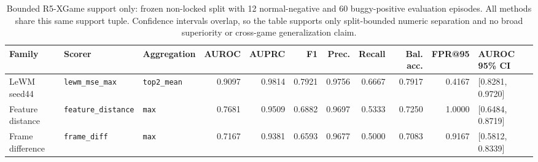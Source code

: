 \begin{table}[t]
\centering
\caption{Bounded R5-XGame support only: frozen non-locked split with 12 normal-negative and
60 buggy-positive evaluation episodes. All methods share this same support tuple. Confidence
intervals overlap, so the table supports only split-bounded numeric separation and no broad
superiority or cross-game generalization claim.}
\label{tab:r5-xgame-results}
\scriptsize
\begin{tabularx}{\textwidth}{@{}lXlrrrrrrrX@{}}
\toprule
Family & Scorer & Aggregation & AUROC & AUPRC & F1 & Prec. & Recall & Bal. acc. & FPR@95 & AUROC 95\% CI \\
\midrule
LeWM seed44 & \texttt{lewm\_mse\_max} & \texttt{top2\_mean} & 0.9097 & 0.9814 & 0.7921 & 0.9756 & 0.6667 & 0.7917 & 0.4167 & [0.8281, 0.9720] \\
Feature distance & \texttt{feature\_distance} & \texttt{max} & 0.7681 & 0.9509 & 0.6882 & 0.9697 & 0.5333 & 0.7250 & 1.0000 & [0.6484, 0.8719] \\
Frame difference & \texttt{frame\_diff} & \texttt{max} & 0.7167 & 0.9381 & 0.6593 & 0.9677 & 0.5000 & 0.7083 & 0.9167 & [0.5812, 0.8339] \\
\bottomrule
\end{tabularx}
\end{table}
